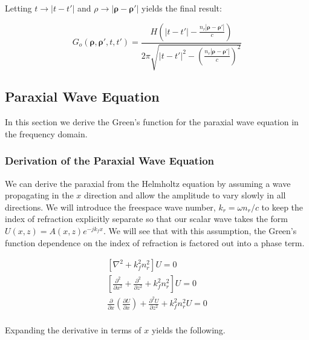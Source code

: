 \noindent Letting $t\rightarrow |t-t'|$ and $\rho \rightarrow |\boldsymbol{\rho} - \boldsymbol{\rho}'|$ yields the final result:

 \begin{equation}
\boxed{G_o\left(\boldsymbol{\rho},\boldsymbol{\rho}',t,t'\right) = \frac{H\left(|t-t'| -\frac{n_r|\boldsymbol{\rho} - \boldsymbol{\rho}'|}{c}\right)}{2\pi \sqrt{|t-t'|^2 -\left(\frac{n_r|\boldsymbol{\rho} - \boldsymbol{\rho}'|}{c}\right)^2 }     }}
\label{gf_eq:40l}
\end{equation}
\renewcommand{\baselinestretch}{2} \small\normalsize

\subsection {Paraxial Wave Equation} \label{gf_sec:paraxial}
In this section we derive the Green's function for the paraxial wave equation in the frequency domain.

\subsubsection {Derivation of the Paraxial Wave Equation}
We can derive the paraxial from the Helmholtz equation by assuming a wave propagating in the $x$ direction and allow the amplitude to vary slowly in all directions. We will introduce the freespace wave number, $k_r = \omega n_r/c$ to keep the index of refraction explicitly separate so that our scalar wave takes the form $U(x,z) = A(x,z)e^{-jk_fx}$. We will see that with this assumption, the Green's function dependence on the index of refraction is factored out into a phase term.

 \begin{equation}
 \begin{gathered}
 \left[ \nabla^2 + k_f^2n_r^2\right]U = 0 \\
\left[\frac{\partial^2 }{\partial x^2} + \frac{\partial^2 }{\partial z^2} + k_f^2n_r^2\right]U = 0 \\
\frac{\partial }{\partial x}\left(\frac{\partial U}{\partial x} \right) + \frac{\partial^2 U}{\partial z^2} + k_f^2n_r^2 U = 0 \\
\end{gathered}
\label{gf_eq:41}
\end{equation}
\renewcommand{\baselinestretch}{2} \small\normalsize

\noindent Expanding the derivative in terms of $x$ yields the following.

